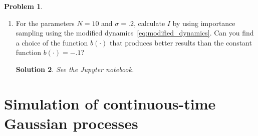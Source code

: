 \documentclass[11pt,a4paper]{article}
\newcommand{\real}{\mathbb R}
\theoremstyle{definition}
\newtheorem{problem}{Problem}
\theoremstyle{plain}
\newtheorem*{solution}{Solution}
\begin{document}
\begin{problem}
\begin{enumerate}
\begin{solution}
\begin{align*}
    \mathbb E [g_{k+1}(V)] &= \mathbb E[g_{k}(V)] \, \mathbb E \left[\exp \left( - \frac{1}{\sigma^2} \left( b(V_{k}) \, Z_{k} + \frac{1}{2} |b(V_{k})|^2 \right) \right)\right] \\
                           &= \mathbb E[g_{k}(V)] \, \int_{\real} \left[ \exp \left( - \frac{1}{\sigma^2} \left( b(V_{k+1}) \, Z_{k+1} + \frac{1}{2} |b(V_{k+1})|^2 \right) \right) \right] \\
\end{align*}
\end{solution}
    \item For the parameters $N = 10$ and $\sigma = .2$, calculate $I$ by using importance sampling using the modified dynamics~\eqref{eq:modified_dynamics}.
        Can you find a choice of the function $b(\cdot)$ that produces better results than the constant function $b(\cdot) = - .1$?
\begin{solution}
    See the Jupyter notebook.
\end{solution}
    \end{enumerate}
\end{problem}



\section*{Simulation of continuous-time Gaussian processes}%
\label{sec:simulation_of_continuous_time_gaussian_processes}
\end{document}
